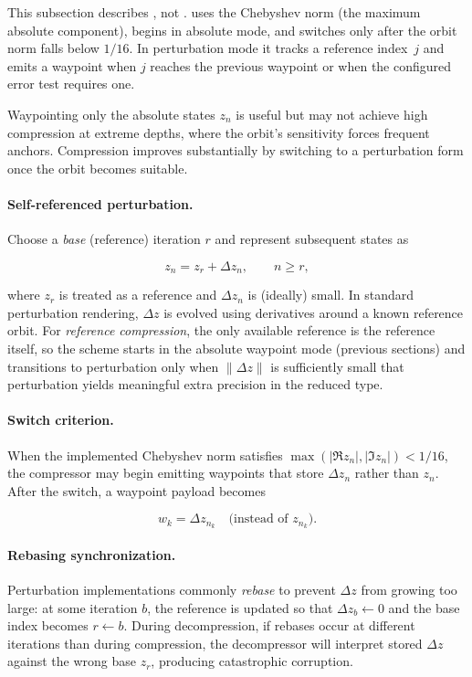 \label{sec:refcomp-pert}
This subsection describes , not
.   uses the Chebyshev norm (the
maximum absolute component), begins in absolute mode, and switches only after
the orbit norm falls below $1/16$.  In perturbation mode it tracks a reference
index~$j$ and emits a waypoint when $j$ reaches the previous waypoint or when
the configured error test requires one.

Waypointing only the absolute states \(z_n\) is useful but may not achieve high
compression at extreme depths, where the orbit's sensitivity forces frequent
anchors.  Compression improves substantially by switching to a perturbation form
once the orbit becomes suitable.

\paragraph{Self-referenced perturbation.}
Choose a \emph{base} (reference) iteration \(r\) and represent subsequent states as

\begin{equation}
  z_n = z_r + \Delta z_n, \qquad n \ge r,
  \label{eq:self-ref-perturbation}
\end{equation}

where \(z_r\) is treated as a reference and \(\Delta z_n\) is (ideally) small.
In standard perturbation rendering, \(\Delta z\) is evolved using derivatives
around a known reference orbit.  For \emph{reference compression}, the only
available reference is the reference itself, so the scheme starts in the
absolute waypoint mode (previous sections) and transitions to perturbation only
when \(\lVert \Delta z \rVert\) is sufficiently small that perturbation yields
meaningful extra precision in the reduced type.

\paragraph{Switch criterion.}
When the implemented Chebyshev norm satisfies
$\max(|\Re z_n|,|\Im z_n|)<1/16$, the compressor may begin emitting waypoints
that store \(\Delta z_n\) rather than \(z_n\).  After the switch, a waypoint
payload becomes

\begin{equation}
  w_k = \Delta z_{n_k} \quad\text{(instead of } z_{n_k}\text{)}.
  \label{eq:pert-waypoint-payload}
\end{equation}

\paragraph{Rebasing synchronization.}
Perturbation implementations commonly \emph{rebase} to prevent \(\Delta z\) from
growing too large: at some iteration \(b\), the reference is updated so that
\(\Delta z_b \leftarrow 0\) and the base index becomes \(r \leftarrow b\).
During decompression, if rebases occur at different iterations than during
compression, the decompressor will interpret stored \(\Delta z\) against the
wrong base \(z_r\), producing catastrophic corruption.

